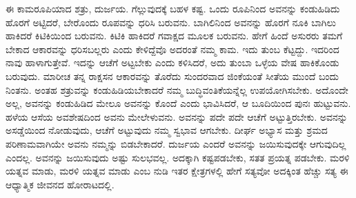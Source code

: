ಈ ಕಾಮರೂಪಿಯಾದ ಶತ್ರು, ದುರ್ಜಯ. ಗೆಲ್ಲುವುದಕ್ಕೆ ಬಹಳ ಕಷ್ಟ. ಒಂದು ರೂಪಿನಿಂದ ಅವನನ್ನು ಕಂಡುಹಿಡಿದು ಹೊರಗೆ ಅಟ್ಟಿದರೆ, ಬೇರೊಂದು ರೂಪವನ್ನು ಧರಿಸಿ ಬರುವನು. ಬಾಗಿಲಿನಿಂದ ಅವನನ್ನು ಹೊರಗೆ ನೂಕಿ ಬಾಗಿಲು ಹಾಕಿದರೆ ಕಿಟಿಕಿಯಿಂದ ಬರುವನು. ಕಿಟಿಕಿ ಹಾಕಿದರೆ ಗವಾಕ್ಷದ ಮೂಲಕ ಬರುವನು. ಹೇಗೆ ಹಿಂದೆ ಅಸುರರು ತಮಗೆ ಬೇಕಾದ ಆಕಾರವನ್ನು ಧರಿಸಬಲ್ಲರು ಎಂದು ಕೇಳಿದ್ದೆವೊ ಅದರಂತೆ ನಮ್ಮ ಕಾಮ. ಇದು ತುಂಬ ಕೆಟ್ಟದ್ದು. ಇದರಿಂದ ನಾವು ಹಾಳಾಗುತ್ತೇವೆ. ಇದನ್ನು ಆಚೆಗೆ ಅಟ್ಟಬೇಕು ಎಂದು ಕಳಿಸಿದರೆ, ಅದು ತುಂಬಾ ಒಳ್ಳೆಯ ವೇಷ ಹಾಕಿಕೊಂಡು ಬರುವುದು. ಮಾರೀಚ ತನ್ನ ರಾಕ್ಷಸನ ಆಕಾರವನ್ನು ತೊರೆದು ಸುಂದರವಾದ ಜಿಂಕೆಯಂತೆ ಸೀತೆಯ ಮುಂದೆ ಬಂದು ನಿಂತನು. ಅಂತಹ ಶತ್ರುವನ್ನು ಕಂಡುಹಿಡಿಯಬೇಕಾದರೆ ನಮ್ಮ ಬುದ್ಧಿವಂತಿಕೆಯನ್ನೆಲ್ಲ ಉಪಯೋಗಿಸಬೇಕು. ಅದೊಂದೇ ಅಲ್ಲ, ಅವನನ್ನು ಕಂಡುಹಿಡಿದ ಮೇಲೂ ಅವನನ್ನು ಕೊಂದೆ ಎಂದು ಭಾವಿಸಿದರೆ, ಆ ಬೂದಿಯಿಂದ ಪುನಃ ಹುಟ್ಟುವನು. ಹಳೆಯ ಆಸೆಯ ಅವಶೇಷದಿಂದ ಅವನು ಮೇಲೇಳುವನು. ಅವನನ್ನು ಪದೇ ಪದೇ ಆಚೆಗೆ ಅಟ್ಟುತ್ತಿರಬೇಕು. ಅವನನ್ನು ಅಸಡ್ಡೆಯಿಂದ ನೋಡುವುದು, ಆಚೆಗೆ ಅಟ್ಟುವುದು ನಮ್ಮ ಸ್ವಭಾವ ಆಗಬೇಕು. ದೀರ್ಘ ಅಭ್ಯಾಸ ಮತ್ತು ಶ್ರಮದ ಪರಿಣಾಮವಾಗಿಯೇ ಅವನು ನಮ್ಮನ್ನು ಬಿಡಬೇಕಾದರೆ. ದುರ್ಜಯ ಎಂದರೆ ಅವನನ್ನು ಜಯಿಸುವುದಕ್ಕೇ ಆಗುವುದಿಲ್ಲ ಎಂದಲ್ಲ. ಅವನನ್ನು ಜಯಿಸುವುದು ಅಷ್ಟು ಸುಲಭವಲ್ಲ. ಅದಕ್ಕಾಗಿ ಕಷ್ಟಪಡಬೇಕು, ಸತತ ಪ್ರಯತ್ನ ಪಡಬೇಕು. ಮರಳಿ ಯತ್ನವ ಮಾಡು, ಮರಳಿ ಯತ್ನವ ಮಾಡು ಎಂಬ ನುಡಿ ಇತರ ಕ್ಷೇತ್ರಗಳಲ್ಲಿ ಹೇಗೆ ಸತ್ಯವೋ ಅದಕ್ಕಿಂತ ಹೆಚ್ಚು ಸತ್ಯ ಈ ಆಧ್ಯಾತ್ಮಿಕ ಜೀವನದ ಹೋರಾಟದಲ್ಲಿ.

